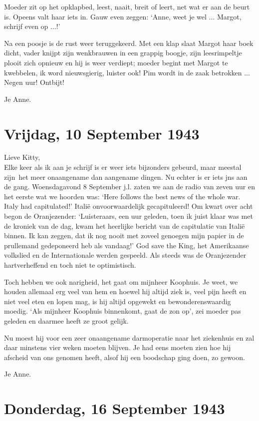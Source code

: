 \documentclass{book}
\begin{document}
Moeder zit op het opklapbed, leest, naait, breit of leert, net wat er
aan de beurt is. Opeens valt haar iets in. Gauw even zeggen: `Anne, weet
je wel ... Margot, schrijf even op ...!'

Na een poosje is de rust weer teruggekeerd. Met een klap slaat Margot
haar boek dicht, vader knijpt zijn wenkbrauwen in een grappig boogje,
zijn leesrimpeltje plooit zich opnieuw en hij is weer verdiept; moeder
begint met Margot te kwebbelen, ik word nieuwsgierig, luister ook! Pim
wordt in de zaak betrokken ... Negen uur! Ontbijt!

Je Anne.

\chapter{Vrijdag, 10 September 1943}

Lieve Kitty,\\Elke keer als ik aan je schrijf is er weer iets bijzonders
gebeurd, maar meestal zijn~het meer onaangename dan aangename dingen. Nu
echter is er iets jns aan de gang. Woensdagavond 8 September j.l. zaten
we aan de radio van zeven uur en het eerste wat we hoorden was: `Here
follows the best news of the whole war. Italy had capitulated!' Italië
onvoorwaardelijk gecapituleerd! Om kwart over acht begon de
Oranjezender: `Luisteraars, een uur geleden, toen ik juist klaar was met
de kroniek van de dag, kwam het heerlijke bericht van de capitulatie van
Italië binnen. Ik kan zeggen, dat ik nog nooit met zoveel genoegen mijn
papier in de prullemand gedeponeerd heb als vandaag!' God save the King,
het Amerikaanse volkslied en de Internationale werden gespeeld. Als
steeds was de Oranjezender hartverheffend en toch niet te optimistisch.

Toch hebben we ook narigheid, het gaat om mijnheer Koophuis. Je weet, we
houden allemaal erg veel van hem en hoewel hij altijd ziek is, veel pijn
heeft en niet veel eten en lopen mag, is hij altijd opgewekt en
bewonderenswaardig moedig. `Als mijnheer Koophuis binnenkomt, gaat de
zon op', zei moeder pas geleden en daarmee heeft ze groot gelijk.

Nu moest hij voor een zeer onaangename darmoperatie naar het ziekenhuis
en zal daar minstens vier weken moeten blijven. Je had eens moeten zien
hoe hij afscheid van ons genomen heeft, alsof hij een boodschap ging
doen, zo gewoon.

Je Anne.

\chapter{Donderdag, 16 September 1943}
\end{document}
